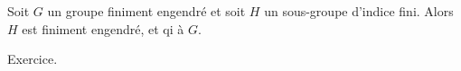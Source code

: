   \begin{cor}
    Soit $G$ un groupe finiment engendré et soit $H$ un sous-groupe d'indice fini. Alors $H$ est finiment
    engendré, et qi à $G$.
  \end{cor}

  \begin{preuve}
    Exercice.
  \end{preuve}

  

  

  




